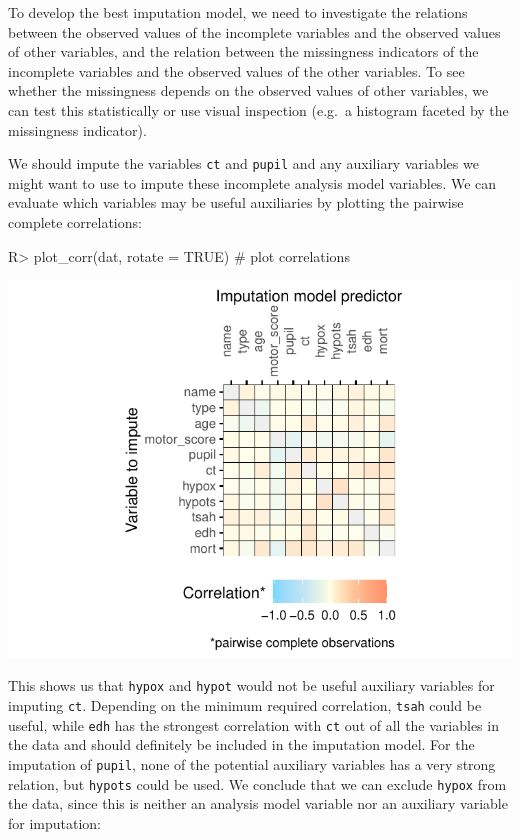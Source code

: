 \documentclass[
]{jss}
\begin{document}
To develop the best imputation model, we need to investigate the
relations between the observed values of the incomplete variables and
the observed values of other variables, and the relation between the
missingness indicators of the incomplete variables and the observed
values of the other variables. To see whether the missingness depends on
the observed values of other variables, we can test this statistically
or use visual inspection (e.g.~a histogram faceted by the missingness
indicator).

We should impute the variables \texttt{ct} and \texttt{pupil} and any
auxiliary variables we might want to use to impute these incomplete
analysis model variables. We can evaluate which variables may be useful
auxiliaries by plotting the pairwise complete correlations:

\begin{CodeChunk}
\begin{CodeInput}
R> plot_corr(dat, rotate = TRUE) # plot correlations 
\end{CodeInput}


\begin{center}\includegraphics{Imputation_of_Incomplete_Multilevel_Data_files/figure-latex/impact_corr-1} \end{center}

\end{CodeChunk}

This shows us that \texttt{hypox} and \texttt{hypot} would not be useful
auxiliary variables for imputing \texttt{ct}. Depending on the minimum
required correlation, \texttt{tsah} could be useful, while \texttt{edh}
has the strongest correlation with \texttt{ct} out of all the variables
in the data and should definitely be included in the imputation model.
For the imputation of \texttt{pupil}, none of the potential auxiliary
variables has a very strong relation, but \texttt{hypots} could be used.
We conclude that we can exclude \texttt{hypox} from the data, since this
is neither an analysis model variable nor an auxiliary variable for
imputation:
\end{document}
